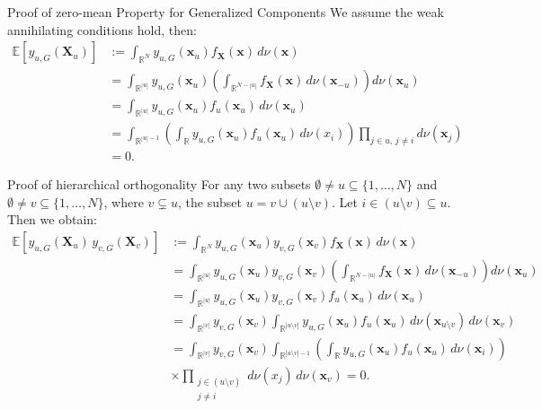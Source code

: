 \begin{frame}{Proof of zero-mean Property for Generalized Components}
  We assume the weak annihilating conditions hold, then:
  \begin{align*}
\mathbb{E}[y_{u,G}(\boldsymbol{X}_u)] 
&:= \int_{\mathbb{R}^N} y_{u,G}(\boldsymbol{x}_u) f_{\boldsymbol{X}}(\boldsymbol{x})\, d \nu (\boldsymbol{x}) \\[0.5em]
&= \int_{\mathbb{R}^{|u|}} y_{u,G}(\boldsymbol{x}_u) \left( \int_{\mathbb{R}^{N - |u|}} f_{\boldsymbol{X}}(\boldsymbol{x}) \, d \nu(\boldsymbol{x}_{-u}) \right) d \nu(\boldsymbol{x}_u) \\[0.5em]
&= \int_{\mathbb{R}^{|u|}} y_{u,G}(\boldsymbol{x}_u) f_u(\boldsymbol{x}_u)\, d \nu(\boldsymbol{x}_u) \\[0.5em]
&= \int_{\mathbb{R}^{|u| - 1}} \left( \int_{\mathbb{R}} y_{u,G}(\boldsymbol{x}_u) f_u(\boldsymbol{x}_u) \, d \nu(x_i) \right) \prod_{j \in u,\, j \ne i} d \nu(\boldsymbol{x}_j) \\[0.5em]
&= 0.
\end{align*}
  
\end{frame}

\begin{frame}{Proof of hierarchical orthogonality}
For any two subsets $\emptyset \ne u \subseteq \{1,\dots,N\}$ and $\emptyset \ne v \subseteq \{1,\dots,N\}$, where $v \subsetneq u$, the subset $u = v \cup (u \setminus v)$. Let $i \in (u \setminus v) \subseteq u$. Then we obtain:
\begin{align*}
\mathbb{E}[y_{u,G}(\boldsymbol{X}_u) \, y_{v,G}(\boldsymbol{X}_v)]
&:= \int_{\mathbb{R}^N} y_{u,G}(\boldsymbol{x}_u) y_{v,G}(\boldsymbol{x}_v) f_{\boldsymbol{X}}(\boldsymbol{x}) \, d \nu(\boldsymbol{x}) \\[0.5em]
&= \int_{\mathbb{R}^{|u|}} y_{u,G}(\boldsymbol{x}_u) y_{v,G}(\boldsymbol{x}_v) \left( \int_{\mathbb{R}^{N - |u|}} f_{\boldsymbol{X}}(\boldsymbol{x}) \, d \nu(\boldsymbol{x}_{-u}) \right) d \nu(\boldsymbol{x}_u) \\[0.5em]
&= \int_{\mathbb{R}^{|u|}} y_{u,G}(\boldsymbol{x}_u) y_{v,G}(\boldsymbol{x}_v) f_u(\boldsymbol{x}_u) \, d \nu(\boldsymbol{x}_u) \\[0.5em]
&= \int_{\mathbb{R}^{|v|}} y_{v,G}(\boldsymbol{x}_v)
    \int_{\mathbb{R}^{|u \setminus v|}} y_{u,G}(\boldsymbol{x}_u) f_u(\boldsymbol{x}_u) \, d \nu(\boldsymbol{x}_{u \setminus v}) \, d \nu(\boldsymbol{x}_v) \\[0.5em]
&= \int_{\mathbb{R}^{|v|}} y_{v,G}(\boldsymbol{x}_v)
    \int_{\mathbb{R}^{|u \setminus v| - 1}} \left( \int_{\mathbb{R}} y_{u,G}(\boldsymbol{x}_u) f_u(\boldsymbol{x}_u) \, d \nu(\boldsymbol{x}_i) \right) \\[0.5em]
&\times \prod_{\substack{j \in (u \setminus v) \\ j \ne i}} d \nu(x_j) \, d \nu(\boldsymbol{x}_v) = 0.
\end{align*}
\end{frame}



